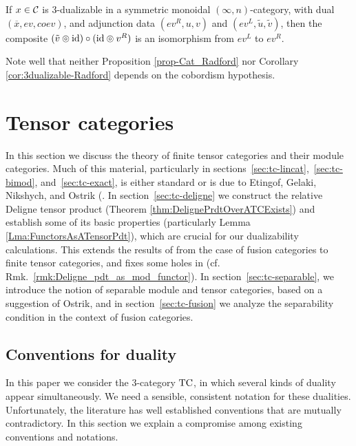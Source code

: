 \documentclass{amsart}
\begin{document}
\begin{corollary} \label{cor:3dualizable-Radford}
If $x \in \mathcal C$ is 3-dualizable in a symmetric monoidal $(\infty,n)$-category, with dual $(\overline{x}, ev, coev)$, and adjunction data $(ev^R, u, v)$ and $(ev^L, \tilde{u}, \tilde{v})$, then the composite $(\tilde{v} \circledcirc \mathrm{id}) \circ (\mathrm{id} \circledcirc v^R)$ is an isomorphism from $ev^L$ to $ev^R$.
\end{corollary}

\nid Note well that neither Proposition \ref{prop-Cat_Radford} nor Corollary \ref{cor:3dualizable-Radford} depends on the cobordism hypothesis.


\section{Tensor categories} \label{sec:tc}

In this section we discuss the theory of finite tensor categories and their module categories.  Much of this material, particularly in sections~\ref{sec:tc-lincat},~\ref{sec:tc-bimod}, and~\ref{sec:tc-exact}, is either standard or is due to Etingof, Gelaki, Nikshych, and Ostrik (\cite{MR1976459,MR2183279,MR2097289, 0909.3140, EGNO}.  In section~\ref{sec:tc-deligne} we construct the relative Deligne tensor product (Theorem \ref{thm:DelignePrdtOverATCExists})
and establish some of its basic properties (particularly Lemma \ref{Lma:FunctorsAsATensorPdt}), which are crucial for our dualizability calculations.  This extends the results of \cite{0909.3140} from the case of fusion categories to finite tensor categories, and fixes some holes in \cite{0911.4979} (cf. Rmk.~\ref{rmk:Deligne_pdt_as_mod_functor}).
In section~\ref{sec:tc-separable}, we introduce the notion of separable module and tensor categories, based on a suggestion of Ostrik, and in section~\ref{sec:tc-fusion} we analyze the separability condition in the context of fusion categories.

\subsection{Conventions for duality} \label{sec:conventions}

In this paper we consider the 3-category $\mathrm{TC}$, in which several kinds of duality appear simultaneously. We need a sensible, consistent notation for these dualities.  Unfortunately, the literature has well established conventions that are mutually contradictory.  In this section we explain a compromise among existing conventions and notations.
\end{document}
